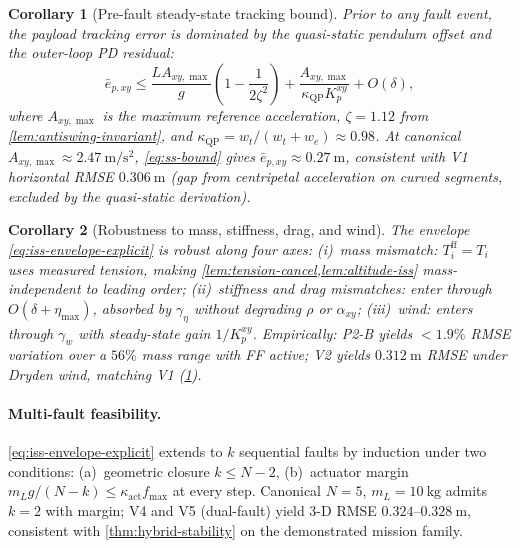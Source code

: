 \documentclass[lettersize,journal]{IEEEtran}
\newtheorem{corollary}{Corollary}%
\begin{document}
\begin{corollary}[Pre-fault steady-state tracking bound]
\label{cor:steady-state}
Prior to any fault event, the payload tracking error is
dominated by the quasi-static pendulum offset and the outer-loop
PD residual:
\begin{equation}
  \bar{e}_{p,xy} \le \frac{L A_{xy,\max}}{g}
    \left(1 - \frac{1}{2\zeta^2}\right)
    + \frac{A_{xy,\max}}{\kappa_{\mathrm{QP}} K_p^{xy}}
    + O(\delta),
  \label{eq:ss-bound}
\end{equation}
where $A_{xy,\max}$ is the maximum reference acceleration,
$\zeta = 1.12$ from \cref{lem:antiswing-invariant}, and
$\kappa_{\mathrm{QP}} = w_t/(w_t + w_e) \approx 0.98$. At
canonical $A_{xy,\max} \approx \SI{2.47}{\metre\per\second\squared}$,
\eqref{eq:ss-bound} gives $\bar{e}_{p,xy} \approx
\SI{0.27}{\metre}$, consistent with V1 horizontal RMSE
$\SI{0.306}{\metre}$ (gap from centripetal acceleration on
curved segments, excluded by the quasi-static derivation).
\end{corollary}

\begin{corollary}[Robustness to mass, stiffness, drag, and wind]
\label{cor:robustness}
The envelope \eqref{eq:iss-envelope-explicit} is robust along four axes: (i)~mass mismatch: $T_i^{\mathrm{ff}} = T_i$ uses measured tension, making \cref{lem:tension-cancel,lem:altitude-iss} mass-independent to leading order; (ii)~stiffness and drag mismatches: enter through $O(\delta + \eta_{\max})$, absorbed by $\gamma_\eta$ without degrading $\rho$ or $\alpha_{xy}$; (iii)~wind: enters through $\gamma_w$ with steady-state gain $1/K_p^{xy}$. Empirically: P2-B yields $<1.9\%$ RMSE variation over a $56\%$ mass range with FF active; V2 yields $\SI{0.312}{\metre}$ RMSE under Dryden wind, matching V1 (\cref{cor:steady-state}).
\end{corollary}

\paragraph{Multi-fault feasibility.}
\eqref{eq:iss-envelope-explicit} extends to $k$ sequential
faults by induction under two conditions: (a)~geometric
closure $k \le N - 2$, (b)~actuator margin
$m_L g/(N{-}k) \le \kappa_{\mathrm{act}} f_{\max}$ at every
step. Canonical $N = 5$, $m_L = \SI{10}{\kilo\gram}$ admits
$k = 2$ with margin; V4 and V5 (dual-fault) yield
3-D RMSE $0.324$--$\SI{0.328}{\metre}$, consistent with
\cref{thm:hybrid-stability} on the demonstrated mission family.
\end{document}
